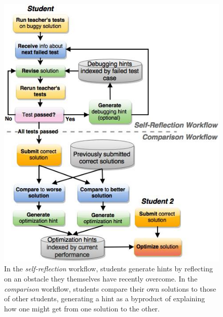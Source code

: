 \begin{figure}
\centering
\includegraphics[width=1.0\linewidth]{Body/figures/classoverflow/CombinedWorkflow_CameraReady_FIXED_2.jpg}
\caption{In the \textit{self-reflection} workflow, students generate hints by reflecting on an obstacle they themselves have recently overcome. In the \textit{comparison} workflow, students compare their own solutions to those of other students, generating a hint as a byproduct of explaining how one might get from one solution to the other.}
\label{fig:workflow}
\end{figure}

